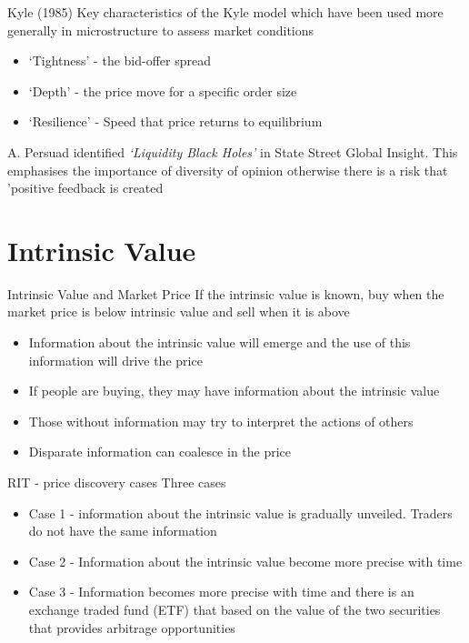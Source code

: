 \documentclass[14pt,xcolor=pdftex,dvipsnames,table]{beamer}
\begin{document}
\begin{frame}{Kyle (1985)}
Key characteristics of the Kyle model which have been used more generally in microstructure to assess market conditions
\pause
\begin{itemize}[<+-| alert@+>]
\item `Tightness' - the bid-offer spread
\item `Depth' - the price move for a specific order size
\item `Resilience' - Speed that price returns to equilibrium
\end{itemize}
\pause
A. Persuad identified \emph{`Liquidity Black Holes'} in State Street Global Insight.  This emphasises the importance of diversity of opinion otherwise there is a risk that 'positive feedback is created
\end{frame}

\section{Intrinsic Value}
\begin{frame}{Intrinsic Value and Market Price}
If the intrinsic value is known, buy when the market price is below intrinsic value and sell when it is above
\pause
\begin{itemize}[<+-| alert@+>]
\item Information about the intrinsic value will emerge and the use of this information will drive the price 
\item If people are buying, they may have information about the intrinsic value
\item Those without information may try to interpret the actions of others
\item Disparate information can coalesce in the price
\end{itemize}
\end{frame}

\begin{frame}{RIT - price discovery cases}
Three cases
\pause
\begin{itemize}[<+-| alert@+>]
\item Case 1 - information about the intrinsic value is gradually unveiled.  Traders do not have the same information 
\item Case 2 - Information about the intrinsic value become more precise with time
\item Case 3 - Information becomes more precise with time and there is an exchange traded fund (ETF) that based on the value of the two securities that provides arbitrage opportunities  
\end{itemize}
\end{frame}
\end{document}
